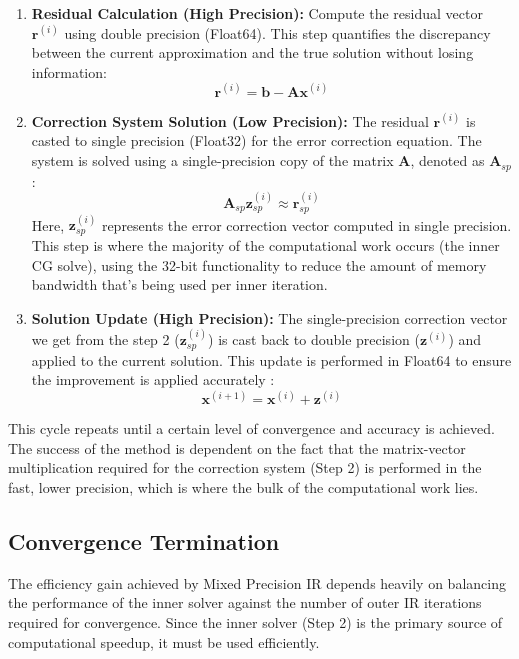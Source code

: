 \documentclass[a4paper,10.5pt,twoside]{article}
\begin{document}
\begin{enumerate}
    \item \textbf{Residual Calculation (High Precision):} 
    Compute the residual vector $\mathbf{r}^{(i)}$ using double precision (Float64). This step quantifies the discrepancy between the current approximation and the true solution without losing information:
    \[
    \mathbf{r}^{(i)} = \mathbf{b} - \mathbf{A}\mathbf{x}^{(i)}
    \]
    
    \item \textbf{Correction System Solution (Low Precision):} 
    The residual $\mathbf{r}^{(i)}$ is casted to single precision (Float32) for the error correction equation. The system is solved using a single-precision copy of the matrix $\mathbf{A}$, denoted as $\mathbf{A}_{sp}$:
    \[
    \mathbf{A}_{sp}\mathbf{z}_{sp}^{(i)} \approx \mathbf{r}_{sp}^{(i)}
    \]
    Here, $\mathbf{z}_{sp}^{(i)}$ represents the error correction vector computed in single precision. This step is where the majority of the computational work occurs (the inner CG solve), using the 32-bit functionality to reduce the amount of memory bandwidth that's being used per inner iteration.
    
    \item \textbf{Solution Update (High Precision):} 
    The single-precision correction vector we get from the step 2 ($\mathbf{z}_{sp}^{(i)}$) is cast back to double precision ($\mathbf{z}^{(i)}$) and applied to the current solution. This update is performed in Float64 to ensure the improvement is applied accurately \autocite{quinlan}:
    \[
    \mathbf{x}^{(i+1)} = \mathbf{x}^{(i)} + \mathbf{z}^{(i)}
    \]
\end{enumerate}

This cycle repeats until a certain level of convergence and accuracy is achieved. The success of the method is dependent on the fact that the matrix-vector multiplication required for the correction system (Step 2) is performed in the fast, lower precision, which is where the bulk of the computational work lies.


\subsection{Convergence Termination}
The efficiency gain achieved by Mixed Precision IR depends heavily on balancing the performance of the inner solver against the number of outer IR iterations required for convergence. Since the inner solver (Step 2) is the primary source of computational speedup, it must be used efficiently.
\end{document}
